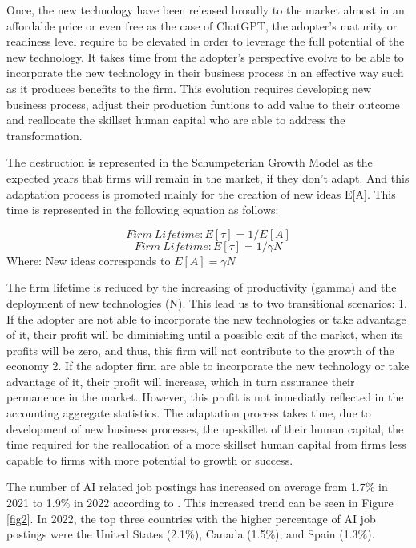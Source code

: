 \documentclass[preprint, 3p,
authoryear]{elsarticle} %
\begin{document}
Once, the new technology have been released broadly to the market almost
in an affordable price or even free as the case of ChatGPT, the
adopter's maturity or readiness level require to be elevated in order to
leverage the full potential of the new technology. It takes time from
the adopter's perspective evolve to be able to incorporate the new
technology in their business process in an effective way such as it
produces benefits to the firm. This evolution requires developing new
business process, adjust their production funtions to add value to their
outcome and reallocate the skillset human capital who are able to
address the transformation.

The destruction is represented in the Schumpeterian Growth Model as the
expected years that firms will remain in the market, if they don't
adapt. And this adaptation process is promoted mainly for the creation
of new ideas E{[}A{]}. This time is represented in the following
equation as follows:

\[
Firm \ Lifetime: E[\tau] = 1/E[A]
\] \[
Firm \ Lifetime: E[\tau] = 1/\gamma N
\] Where: New ideas corresponds to \(E[A] = \gamma N\)

The firm lifetime is reduced by the increasing of productivity (gamma)
and the deployment of new technologies (N). This lead us to two
transitional scenarios: 1. If the adopter are not able to incorporate
the new technologies or take advantage of it, their profit will be
diminishing until a possible exit of the market, when its profits will
be zero, and thus, this firm will not contribute to the growth of the
economy 2. If the adopter firm are able to incorporate the new
technology or take advantage of it, their profit will increase, which in
turn assurance their permanence in the market. However, this profit is
not inmediatly reflected in the accounting aggregate statistics. The
adaptation process takes time, due to development of new business
processes, the up-skillet of their human capital, the time required for
the reallocation of a more skillset human capital from firms less
capable to firms with more potential to growth or success.

The number of AI related job postings has increased on average from
1.7\% in 2021 to 1.9\% in 2022 according to \citep{reportAI}. This
increased trend can be seen in Figure \ref{fig2}. In 2022, the top three
countries with the higher percentage of AI job postings were the United
States (2.1\%), Canada (1.5\%), and Spain (1.3\%).
\end{document}
